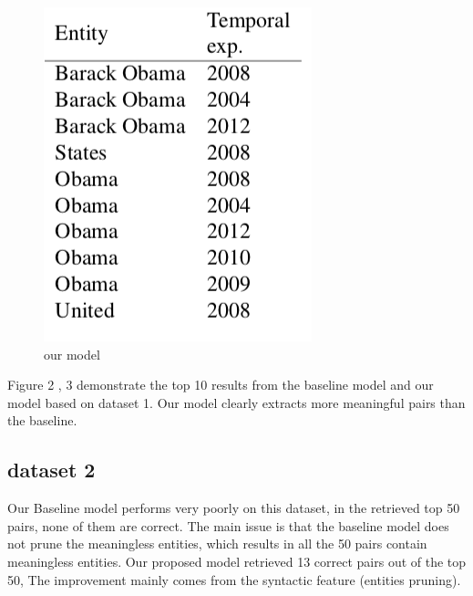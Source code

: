 \documentclass[12pt,a4paper]{article}
\begin{document}
\begin{figure}[htbp]
\begin{minipage}[t]{0.45\linewidth}
    \includegraphics[width=\linewidth]{new_set1}
    \caption{our model}
\end{minipage} 
\end{figure}

Figure 2 , 3 demonstrate the top 10 results from the baseline model and our model based on dataset 1. Our model clearly extracts more meaningful pairs than the baseline.

\subsection{dataset 2}
Our Baseline model performs very poorly on this dataset, in the retrieved top 50 pairs, none of them are correct. The main issue is that the baseline model does not prune the meaningless entities, which results in all the 50 pairs contain meaningless entities. Our proposed model retrieved 13 correct pairs out of the top 50, The improvement mainly comes from the syntactic feature (entities pruning). 
\end{document}
